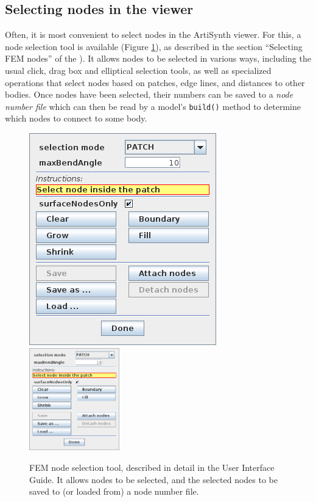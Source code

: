 \subsection{Selecting nodes in the viewer}

Often, it is most convenient to select nodes in the ArtiSynth viewer.
For this, a node selection tool is available
(Figure \ref{nodeSelection:fig}), as described in the section
``Selecting FEM nodes'' of the
).
It allows nodes to be selected in various ways, including the usual
click, drag box and elliptical selection tools, as well as specialized
operations that select nodes based on patches, edge lines, and
distances to other bodies. Once nodes have been selected, their
numbers can be saved to a {\it node number file} which can then be
read by a model's {\tt build()} method to determine which nodes to
connect to some body.

\begin{figure}[ht]
\begin{center}
\iflatexml
   \includegraphics[]{images/nodeSelectToolPatch}
\else
   \includegraphics[width=0.35\textwidth]{images/nodeSelectToolPatch}
\fi
\end{center}
\caption{FEM node selection tool, described in detail in the
User Interface Guide. It allows nodes to be selected,
and the selected nodes to be saved to (or loaded from) a node number file.}
\label{nodeSelection:fig}
\end{figure}

